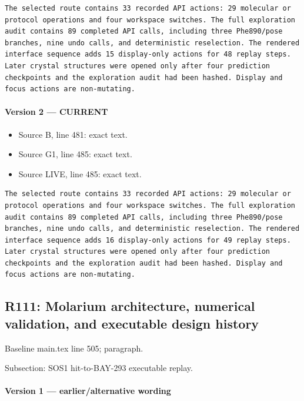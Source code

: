 \documentclass[11pt]{article}
\begin{document}
\begin{lstlisting}
The selected route contains 33 recorded API actions: 29 molecular or protocol operations and four workspace switches. The full exploration audit contains 89 completed API calls, including three Phe890/pose branches, nine undo calls, and deterministic reselection. The rendered interface sequence adds 15 display-only actions for 48 replay steps. Later crystal structures were opened only after four prediction checkpoints and the exploration audit had been hashed. Display and focus actions are non-mutating.
\end{lstlisting}

\paragraph{Version 2 --- CURRENT}

\begin{itemize}[leftmargin=*]
\item Source B, line 481: exact text.
\item Source G1, line 485: exact text.
\item Source LIVE, line 485: exact text.
\end{itemize}

\begin{lstlisting}
The selected route contains 33 recorded API actions: 29 molecular or protocol operations and four workspace switches. The full exploration audit contains 89 completed API calls, including three Phe890/pose branches, nine undo calls, and deterministic reselection. The rendered interface sequence adds 16 display-only actions for 49 replay steps. Later crystal structures were opened only after four prediction checkpoints and the exploration audit had been hashed. Display and focus actions are non-mutating.
\end{lstlisting}

\subsection{R111: Molarium architecture, numerical validation, and executable design history}

Baseline main.tex line 505; paragraph.

Subsection: SOS1 hit-to-BAY-293 executable replay.

\paragraph{Version 1 --- earlier/alternative wording}
\end{document}
